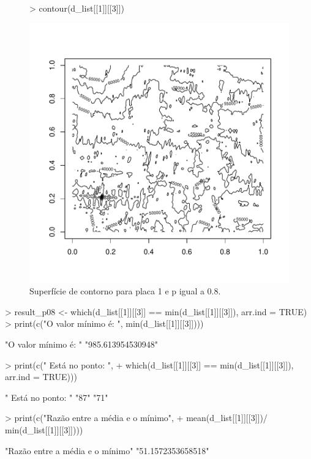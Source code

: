 \documentclass[12pt]{article}
\begin{document}
\begin{figure}
\centering
\begin{Schunk}
\begin{Sinput}
> contour(d_list[[1]][[3]])
\end{Sinput}
\end{Schunk}
\includegraphics{template_matching-010}
\caption{Superfície de contorno para placa 1 e p igual a 0.8.}
\label{placa1p08}
\end{figure}
\begin{Schunk}
\begin{Sinput}
> result_p08 <- which(d_list[[1]][[3]] == min(d_list[[1]][[3]]), arr.ind = TRUE)
> print(c("O valor mínimo é: ",  min(d_list[[1]][[3]])))
\end{Sinput}
\begin{Soutput}
[1] "O valor mínimo é: " "985.613954530948"  
\end{Soutput}
\begin{Sinput}
> print(c(" Está no ponto: ",
+         which(d_list[[1]][[3]] == min(d_list[[1]][[3]]), arr.ind = TRUE)))
\end{Sinput}
\begin{Soutput}
[1] " Está no ponto: " "87"               "71"              
\end{Soutput}
\begin{Sinput}
> print(c("Razão entre a média e o mínimo", 
+         mean(d_list[[1]][[3]])/ min(d_list[[1]][[3]])))
\end{Sinput}
\begin{Soutput}
[1] "Razão entre a média e o mínimo" "51.1572353658518"              
\end{Soutput}
\end{Schunk}
\end{document}
